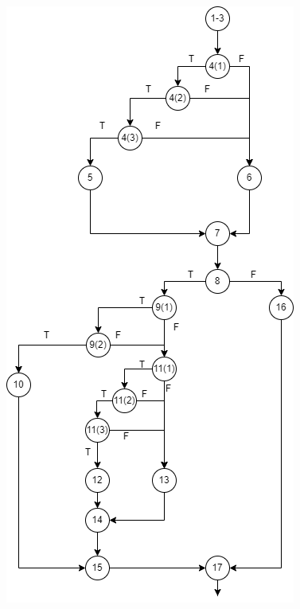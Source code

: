 \documentclass[12pt, letterpaper, titlepage]{article}
\begin{document}
\begin{enumerate}[a)]
    \includegraphics[scale=0.39]{Image2.png}
\end{enumerate}
\end{document}
